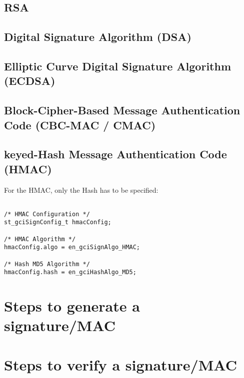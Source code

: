 \subsection{RSA}


\label{signRsa}
\subsection{Digital Signature Algorithm (DSA)}
\label{signDsa}


\subsection{Elliptic Curve Digital Signature Algorithm (ECDSA)}
\label{signEcdsa}


\subsection{Block-Cipher-Based Message Authentication Code (CBC-MAC / CMAC)}
\label{signCmac}


\subsection{keyed-Hash Message Authentication Code (HMAC)}
\label{signHmac}

For the HMAC, only the Hash has to be specified:

\begin{lstlisting}

/* HMAC Configuration */
st_gciSignConfig_t hmacConfig;

/* HMAC Algorithm */
hmacConfig.algo = en_gciSignAlgo_HMAC;

/* Hash MD5 Algorithm */
hmacConfig.hash = en_gciHashAlgo_MD5;

\end{lstlisting}


\section{Steps to generate a signature/MAC}
\label{signGen}


\section{Steps to verify a signature/MAC}
\label{signVfy}

